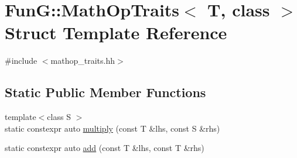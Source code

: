 \hypertarget{structFunG_1_1MathOpTraits}{\section{Fun\-G\-:\-:Math\-Op\-Traits$<$ T, class $>$ Struct Template Reference}
\label{structFunG_1_1MathOpTraits}
}


{\ttfamily \#include $<$mathop\-\_\-traits.\-hh$>$}

\subsection*{Static Public Member Functions}
\begin{DoxyCompactItemize}
\item 
{\footnotesize template$<$class S $>$ }\\static constexpr auto \hyperlink{structFunG_1_1MathOpTraits_aeafa649bb964e8280e50d46bc9de5f48}{multiply} (const T \&lhs, const S \&rhs)
\item 
static constexpr auto \hyperlink{structFunG_1_1MathOpTraits_a41f952d5f51ac17f9ed49218a6894605}{add} (const T \&lhs, const T \&rhs)
\end{DoxyCompactItemize}


